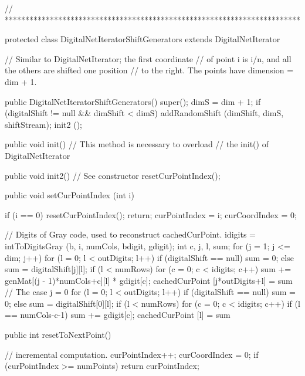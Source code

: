 \begin{code}\begin{hide}

// ************************************************************************

   protected class DigitalNetIteratorShiftGenerators 
                   extends DigitalNetIterator {
      // Similar to DigitalNetIterator; the first coordinate
      // of point i is i/n, and all the others are shifted one position
      // to the right. The points have dimension = dim + 1.

      public DigitalNetIteratorShiftGenerators() {
         super();
         dimS = dim + 1;
         if (digitalShift != null && dimShift < dimS)
            addRandomShift (dimShift, dimS, shiftStream);
         init2 ();
      }

      public void init() {   // This method is necessary to overload
      }                      // the init() of DigitalNetIterator 

      public void init2() { // See constructor
         resetCurPointIndex();
      }


      public void setCurPointIndex (int i) {
         if (i == 0) {
            resetCurPointIndex();
            return;
         }
         curPointIndex = i;
         curCoordIndex = 0;

         // Digits of Gray code, used to reconstruct cachedCurPoint.
         idigits = intToDigitsGray (b, i, numCols, bdigit, gdigit);
         int c, j, l, sum;
         for (j = 1; j <= dim; j++) {
            for (l = 0; l < outDigits; l++) {
               if (digitalShift == null) 
                  sum = 0;
               else 
                  sum = digitalShift[j][l]; 
               if (l < numRows) 
                  for (c = 0; c < idigits; c++)
                     sum += genMat[(j - 1)*numCols+c][l] * gdigit[c];
               cachedCurPoint [j*outDigits+l] = sum %
            }
         }
         // The case j = 0
         for (l = 0; l < outDigits; l++) {
            if (digitalShift == null) 
               sum = 0;
            else 
               sum = digitalShift[0][l]; 
            if (l < numRows) 
               for (c = 0; c < idigits; c++)
                  if (l == numCols-c-1)
                     sum += gdigit[c];
            cachedCurPoint [l] = sum %
         }         
      }

      public int resetToNextPoint() {
         // incremental computation.
         curPointIndex++;
         curCoordIndex = 0;
         if (curPointIndex >= numPoints)
            return curPointIndex;

}}
\end{hide}
\end{code}
